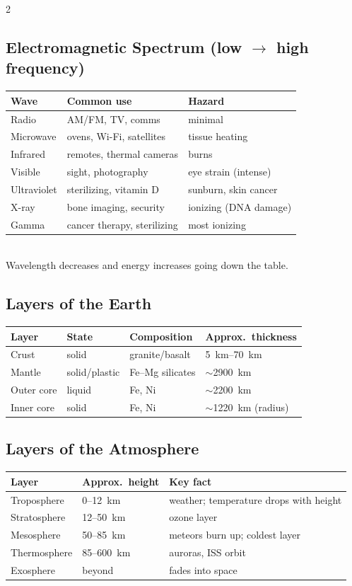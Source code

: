 \begin{multicols}{2}
\subsection*{Electromagnetic Spectrum (low $\rightarrow$ high frequency)}
\begin{tabular}{@{}p{1.6cm}p{3.3cm}p{2.7cm}@{}}
\toprule
Wave & Common use & Hazard\\ \midrule
Radio & AM/FM, TV, comms & minimal\\
Microwave & ovens, Wi-Fi, satellites & tissue heating\\
Infrared & remotes, thermal cameras & burns\\
Visible & sight, photography & eye strain (intense)\\
Ultraviolet & sterilizing, vitamin D & sunburn, skin cancer\\
X-ray & bone imaging, security & ionizing (DNA damage)\\
Gamma & cancer therapy, sterilizing & most ionizing\\ \bottomrule
\end{tabular}\\[2pt]
Wavelength decreases and energy increases going down the table.

\subsection*{Layers of the Earth}
\begin{tabular}{@{}p{1.6cm}p{1.6cm}p{2.2cm}p{2.2cm}@{}}
\toprule
Layer & State & Composition & Approx.\ thickness\\ \midrule
Crust & solid & granite/basalt & \SIrange{5}{70}{km}\\
Mantle & solid/plastic & Fe--Mg silicates & $\sim$\SI{2900}{km}\\
Outer core & liquid & Fe, Ni & $\sim$\SI{2200}{km}\\
Inner core & solid & Fe, Ni & $\sim$\SI{1220}{km} (radius)\\ \bottomrule
\end{tabular}

\subsection*{Layers of the Atmosphere}
\begin{tabular}{@{}p{1.9cm}p{1.8cm}p{3.9cm}@{}}
\toprule
Layer & Approx.\ height & Key fact\\ \midrule
Troposphere & 0--\SI{12}{km} & weather; temperature drops with height\\
Stratosphere & 12--\SI{50}{km} & ozone layer\\
Mesosphere & 50--\SI{85}{km} & meteors burn up; coldest layer\\
Thermosphere & 85--\SI{600}{km} & auroras, ISS orbit\\
Exosphere & beyond & fades into space\\ \bottomrule
\end{tabular}


\end{multicols}
